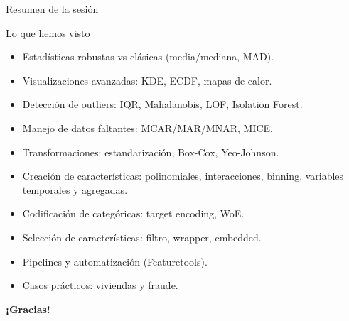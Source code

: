 \documentclass[aspectratio=169, 10pt, xcolor=table]{beamer}
\begin{document}
\begin{frame}{Resumen de la sesión}
    \begin{exampleblock}{Lo que hemos visto}
        \begin{itemize}
            \item Estadísticas robustas vs clásicas (media/mediana, MAD).
            \item Visualizaciones avanzadas: KDE, ECDF, mapas de calor.
            \item Detección de outliers: IQR, Mahalanobis, LOF, Isolation Forest.
            \item Manejo de datos faltantes: MCAR/MAR/MNAR, MICE.
            \item Transformaciones: estandarización, Box-Cox, Yeo-Johnson.
            \item Creación de características: polinomiales, interacciones, binning, variables temporales y agregadas.
            \item Codificación de categóricas: target encoding, WoE.
            \item Selección de características: filtro, wrapper, embedded.
            \item Pipelines y automatización (Featuretools).
            \item Casos prácticos: viviendas y fraude.
        \end{itemize}
    \end{exampleblock}
    \vspace{0.2cm}

\end{frame}

\begin{frame}
    \centering
    \Huge \textbf{¡Gracias!}

\end{frame}
\end{document}
